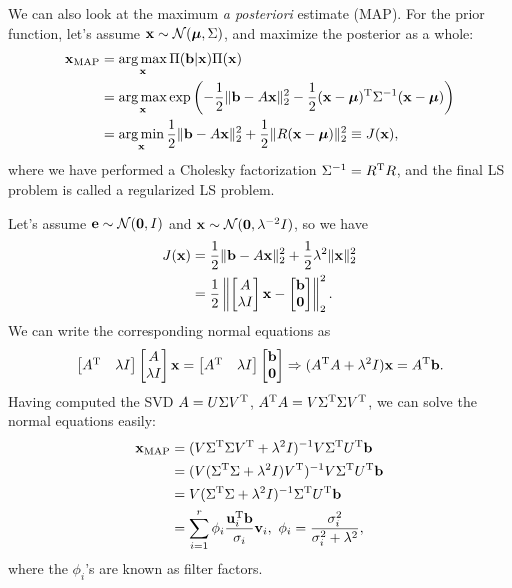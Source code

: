 \documentclass{article}
\begin{document}
We can also look at the maximum \textit{a posteriori} estimate (MAP). For the prior function, let's assume $\bm{\mathrm{x}}\sim\mathcal{N}(\bm{\mathrm{\mu}},\Sigma)$, and maximize the posterior as a whole:
\begin{align}
    \bm{\mathrm{x}}_{\mathrm{MAP}}&=\operatorname*{arg\,max}_{\bm{\mathrm{x}}}\Pi(\bm{\mathrm{b}}|\bm{\mathrm{x}})\Pi(\bm{\mathrm{x}})\\
    &=\operatorname*{arg\,max}_{\bm{\mathrm{x}}}\exp\left(-\frac{1}{2}\lVert\bm{\mathrm{b}}-A\bm{\mathrm{x}}\rVert_2^2-\frac{1}{2}(\bm{\mathrm{x}}-\bm{\mathrm{\mu}})^{\text{T}}\Sigma^{-1}(\bm{\mathrm{x}}-\bm{\mathrm{\mu}})\right)\\
    &=\operatorname*{arg\,min}_{\bm{\mathrm{x}}}\frac{1}{2}\lVert\bm{\mathrm{b}}-A\bm{\mathrm{x}}\rVert_2^2+\frac{1}{2}\lVert R(\bm{\mathrm{x}}-\bm{\mathrm{\mu}})\rVert_2^2\equiv J(\bm{\mathrm{x}}),
\end{align}
where we have performed a Cholesky factorization $\Sigma^{-1}=R^{\text{T}} R$, and the final LS problem is called a regularized LS problem. 

Let's assume $\bm{\mathrm{e}}\sim\mathcal{N}(\bm{\mathrm{0}},I)$ and $\bm{\mathrm{x}}\sim\mathcal{N}(\bm{\mathrm{0}},\lambda^{-2}I)$, so we have
\begin{align}
    J(\bm{\mathrm{x}})&=\frac{1}{2}\lVert\bm{\mathrm{b}}-A\bm{\mathrm{x}}\rVert_2^2+\frac{1}{2}\lambda^2\lVert \bm{\mathrm{x}}\rVert_2^2\\
    &=\frac{1}{2}\left\lVert\begin{bmatrix}{A}\\{\lambda I}\end{bmatrix}\bm{\mathrm{x}}-\begin{bmatrix}{\bm{\mathrm{b}}}\\{\bm{\mathrm{0}}}\end{bmatrix}\right\rVert_2^2.
\end{align}
We can write the corresponding normal equations as 
\begin{equation}
    \begin{bmatrix}
        A^{\text{T}} & \lambda I
    \end{bmatrix}
    \begin{bmatrix}{A}\\{\lambda I}\end{bmatrix}\bm{\mathrm{x}}=\begin{bmatrix}
        A^{\text{T}} & \lambda I
    \end{bmatrix}\begin{bmatrix}{\bm{\mathrm{b}}}\\{\bm{\mathrm{0}}}\end{bmatrix}\Rightarrow(A^{\text{T}} A+\lambda^2I)\bm{\mathrm{x}}=A^{\text{T}}\bm{\mathrm{b}}.
\end{equation}
Having computed the SVD $A=U\Sigma V^{\text{T}}$, $A^{\text{T}} A=V\Sigma^{\text{T}}\Sigma V^{\text{T}}$, we can solve the normal equations easily:
\begin{align}
    \bvec{x}_{\mathrm{MAP}}&=(V\Sigma\tp\Sigma V\tp+\lambda^2I)^{-1}V\Sigma\tp U\tp\bvec{b}\\
    &=(V(\Sigma\tp\Sigma+\lambda^2I)V\tp)^{-1}V\Sigma\tp U\tp\bvec{b}\\
    &=V(\Sigma\tp\Sigma+\lambda^2I)^{-1}\Sigma\tp U\tp\bvec{b}\\
    &=\sum_{i=1}^r\phi_i\frac{\bvec{u}_i\tp\bvec{b}}{\sigma_i}\bvec{v}_i,\ \phi_i=\frac{\sigma_i^2}{\sigma_i^2+\lambda^2},
\end{align}
where the $\phi_i$'s are known as filter factors.
\end{document}
